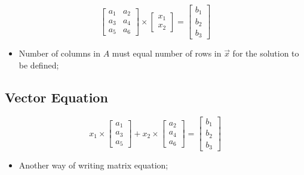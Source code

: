     \begin{equation}
      \begin{bmatrix}
        a_{1} & a_{2}  \\ 
        a_{3} & a_{4}  \\ 
        a_{5} & a_{6} 
      \end{bmatrix}
      \times
      \begin{bmatrix}
        x_{1} \\ 
        x_{2} 
      \end{bmatrix}
      = 
      \begin{bmatrix}
        b_{1} \\ 
        b_{2} \\ 
        b_{3}
      \end{bmatrix}
    \end{equation}
    
    \begin{itemize}
      \item Number of columns in $ A $ must equal number of rows in $ \vec{x} $
      for the solution to be defined;
    \end{itemize}
    
  \subsection{Vector Equation}
    
    \begin{equation}
      x_{1} \times 
      \begin{bmatrix}
        a_{1} \\ 
        a_{3} \\ 
        a_{5}
      \end{bmatrix}
      + 
      x_{2} \times 
      \begin{bmatrix}
        a_{2} \\ 
        a_{4} \\ 
        a_{6}
      \end{bmatrix}
      = 
      \begin{bmatrix}
        b_{1} \\ 
        b_{2} \\ 
        b_{3}
      \end{bmatrix}
    \end{equation}
  
    \begin{itemize}
      \item Another way of writing matrix equation;
    \end{itemize}
  
